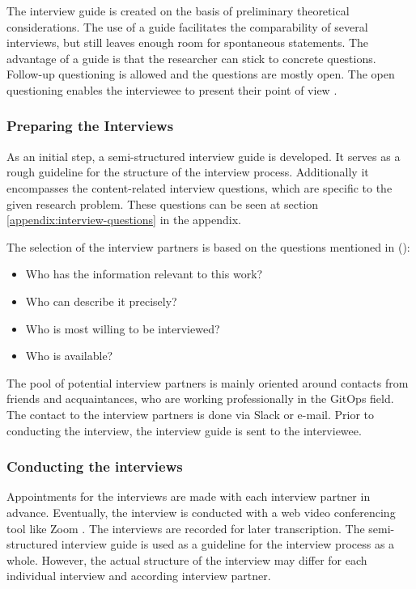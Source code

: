 The interview guide is created on the basis of preliminary theoretical considerations.
The use of a guide facilitates the comparability of several interviews,
but still leaves enough room for spontaneous statements.
The advantage of a guide is that the researcher can stick to concrete questions.
Follow-up questioning is allowed and the questions are mostly open.
The open questioning enables the interviewee to present their point of view
\autocite{berger2016wissenschaftliches}.


\subsubsection*{Preparing the Interviews}

As an initial step,
a semi-structured interview guide is developed.
It serves as a rough guideline for the structure of the interview process.
Additionally it encompasses the content-related interview questions,
which are specific to the given research problem.
These questions can be seen at section \ref{appendix:interview-questions} in the appendix.

The selection of the interview partners is based on the questions mentioned in
\citeauthor{glaser2010experteninterviews} (\citeyear{glaser2010experteninterviews}):

\begin{itemize}
	\item Who has the information relevant to this work?
	\item Who can describe it precisely?
	\item Who is most willing to be interviewed?
	\item Who is available?
\end{itemize}

The pool of potential interview partners is mainly oriented around
contacts from friends and acquaintances,
who are working professionally in the GitOps field.
The contact to the interview partners is done via Slack \autocite{slackWebsite} or e-mail.
Prior to conducting the interview, the interview guide is sent to the interviewee.

\subsubsection*{Conducting the interviews}

Appointments for the interviews are made with each interview partner in advance. 
Eventually, the interview is conducted with a web video conferencing tool like Zoom \autocite{zoomWebsite}.
The interviews are recorded for later transcription.
The semi-structured interview guide
is used as a guideline for the interview process as a whole.
However, the actual structure of the interview may differ for each individual interview and according interview partner.

